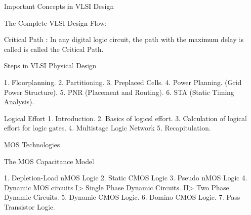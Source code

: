 Important Concepts in VLSI Design

The Complete VLSI Design Flow:

















































Critical Path : In any digital logic circuit, the path with the maximum delay is called is called the Critical Path.

Steps in VLSI Physical Design

1. Floorplanning.
2. Partitioning.
3. Preplaced Cells.
4. Power Planning. (Grid Power Structure).
5. PNR (Placement and Routing).
6. STA (Static Timing Analysis).



									Logical Effort
1. Introduction.
2. Basics of logicsl effort.
3. Calculation of logical effort for logic gates.
4. Multistage Logic Network
5. Recapitulation. 







									MOS Technologies

The MOS Capacitance Model


















1. Depletion-Load nMOS Logic
2. Static CMOS Logic
3. Pseudo nMOS Logic
4. Dynamic MOS circuits
    I> Single Phase Dynamic Circuits.
    II> Two Phase Dynamic Circuits.
5. Dynamic CMOS Logic.
6. Domino CMOS Logic.
7. Pass Transistor Logic.


